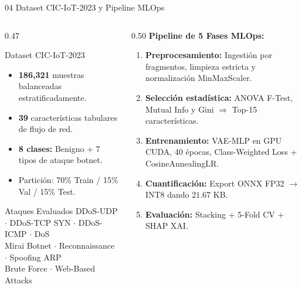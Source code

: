 \documentclass[aspectratio=169, 10pt]{beamer}
\begin{document}
\begin{frame}{04 \quad Dataset CIC-IoT-2023 y Pipeline MLOps}
  \begin{columns}[T]
    \begin{column}{0.47\textwidth}
      \begin{block}{Dataset CIC-IoT-2023}
        \begin{itemize}\small
          \item \textbf{186,321} muestras balanceadas estratificadamente.
          \item \textbf{39} características tabulares de flujo de red.
          \item \textbf{8 clases:} Benigno + 7 tipos de ataque botnet.
          \item Partición: 70\% Train / 15\% Val / 15\% Test.
        \end{itemize}
      \end{block}

      \vspace{5pt}
      \begin{block}{Ataques Evaluados}
        \footnotesize
        DDoS-UDP $\cdot$ DDoS-TCP SYN $\cdot$ DDoS-ICMP $\cdot$ DoS\\
        Mirai Botnet $\cdot$ Reconnaissance $\cdot$ Spoofing ARP\\
        Brute Force $\cdot$ Web-Based Attacks
      \end{block}
    \end{column}

    \begin{column}{0.50\textwidth}
      \textbf{Pipeline de 5 Fases MLOps:}\\[6pt]
      \begin{enumerate}\small
        \item[\textcolor{cyanneon}{1.}] \textbf{Preprocesamiento:} Ingestión por fragmentos,
              limpieza estricta y normalización MinMaxScaler.
        \item[\textcolor{cyanneon}{2.}] \textbf{Selección estadística:} ANOVA F-Test,
              Mutual Info y Gini $\Rightarrow$ Top-15 características.
        \item[\textcolor{cyanneon}{3.}] \textbf{Entrenamiento:} VAE-MLP en GPU CUDA,
              40 épocas, Class-Weighted Loss + CosineAnnealingLR.
        \item[\textcolor{cyanneon}{4.}] \textbf{Cuantificación:} Export ONNX FP32
              $\rightarrow$ INT8 dando $21.67$ KB.
        \item[\textcolor{goldacc}{5.}] \textbf{Evaluación:} Stacking + 5-Fold CV + SHAP XAI.
      \end{enumerate}
    \end{column}
  \end{columns}
\end{frame}
\end{document}

